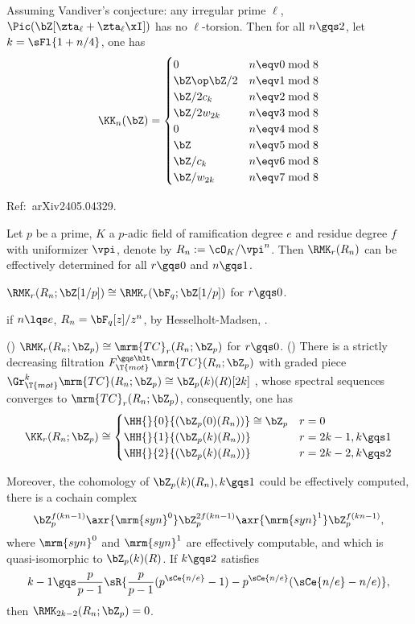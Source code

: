 \documentclass[article, a4paper, twoside]{universal}
\begin{document}
\begin{thm}[\Rnum{6}.10.2]
    Assuming Vandiver's conjecture: any irregular prime $\ell$, $\Pic(\bZ[\zta_{\ell}+\zta_{\ell}\xI])$ has no $\ell$-torsion. Then for all $n\gqs2$, let $k=\sFl{1+n/4}$, one has
    \[
        \KK_{n}(\bZ)= \begin{cases}
          0 & n\eqv0\bmod 8 \\
          \bZ\op \bZ/2 & n\eqv1\bmod 8 \\
          \bZ/2c_{k} & n\eqv2\bmod 8 \\
          \bZ/2w_{2k} & n\eqv3\bmod 8 \\
          0 & n\eqv4\bmod 8 \\
          \bZ & n\eqv5\bmod 8 \\
          \bZ/c_{k} & n\eqv6\bmod 8 \\
          \bZ/w_{2k} & n\eqv7\bmod 8
        \end{cases}
    \]
\end{thm}


Ref:~arXiv2405.04329.

\begin{stp}
    Let $p$ be a prime, $K$ a $p$-adic field of ramification degree $e$ and residue degree $f$ with uniformizer $\vpi$, denote by $R_{n}:=\cO_{K}/\vpi^{n}$. Then $\RMK_{r}(R_{n})$ can be effectively determined for all $r\gqs0$ and $n\gqs1$.

\end{stp}

 $\RMK_{r}(R_{n};\bZ[1/p])\cong \RMK_{r}(\bF_{q};\bZ[1/p])$ for $r\gqs0$.
\begin{cmt}[1]
if $n\lqs e$, $R_{n}=\bF_{q}[z]/z^{n}$, by Hesselholt-Madsen\cite{HM1997Cyclic}, .
\end{cmt}

(\cite{DGMC2013}) $\RMK_{r}(R_{n};\bZ_{p})\cong\mrm{TC}_{r}(R_{n};\bZ_{p})$ for $r\gqs0$. (\cite{BMS2019}) There is a strictly decreasing filtration $F_{\T{mot}}^{\gqs\blt}\mrm{TC}(R_{n};\bZ_{p})$ with graded piece $\Gr_{\T{mot}}^{k}\mrm{TC}(R_{n};\bZ_{p})\cong\bZ_{p}(k)(R)[2k]$ , whose spectral sequences converges to $\mrm{TC}_{r}(R_{n};\bZ_{p})$, consequently, one has
\[
    \KK_{r}(R_{n};\bZ_{p})\cong \begin{cases}
      \HH{}{0}{(\bZ_{p}(0)(R_{n}))}\cong \bZ_{p} & r = 0 \\
      \HH{}{1}{(\bZ_{p}(k)(R_{n}))} & r=2k-1, k\gqs1 \\
      \HH{}{2}{(\bZ_{p}(k)(R_{n}))} & r=2k-2, k\gqs2
    \end{cases}
\]


Moreover, the cohomology of $\bZ_{p}(k)(R_{n}),k\gqs1$ could be effectively computed, there is a cochain complex
\[
    \bZ_{p}^{f(kn-1)}\axr{\mrm{syn}^{0}}\bZ_{p}^{2f(kn-1)}\axr{\mrm{syn}^{1}}\bZ_{p}^{f(kn-1)},
\]
where $\mrm{syn}^{0}$ and $\mrm{syn}^{1}$ are effectively computable, and which is quasi-isomorphic to $\bZ_{p}(k)(R)$. If $k\gqs2$ satisfies
\[
    k-1\gqs\frac{p}{p-1}\sR{\frac{p}{p-1}(p^{\sCe{n/e}}-1)-p^{\sCe{n/e}}(\sCe{n/e}-n/e)},
\]
then $\RMK_{2k-2}(R_{n};\bZ_{p})=0$.



\printref
\end{document}
